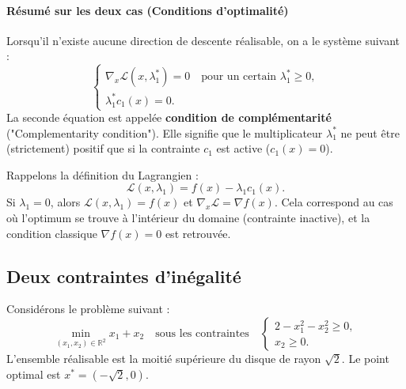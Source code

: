 \paragraph{Résumé sur les deux cas (Conditions d'optimalité)}
Lorsqu'il n'existe aucune direction de descente réalisable, on a le système suivant :
\begin{equation}
    \begin{cases}
        \nabla_x \mathcal{L}(x, \lambda_1^*) = 0 \quad \text{pour un certain } \lambda_1^* \ge 0, \\
        \lambda_1^* c_1(x) = 0.
    \end{cases}
\end{equation}
La seconde équation est appelée \textbf{condition de complémentarité} ("Complementarity condition").
Elle signifie que le multiplicateur $\lambda_1^*$ ne peut être (strictement) positif que si la contrainte $c_1$ est active ($c_1(x)=0$).

Rappelons la définition du Lagrangien :
\begin{equation}
    \mathcal{L}(x, \lambda_1) = f(x) - \lambda_1 c_1(x).
\end{equation}
Si $\lambda_1 = 0$, alors $\mathcal{L}(x, \lambda_1) = f(x)$ et $\nabla_x \mathcal{L} = \nabla f(x)$. Cela correspond au cas où l'optimum se trouve à l'intérieur du domaine (contrainte inactive), et la condition classique $\nabla f(x) = 0$ est retrouvée.

\subsection{Deux contraintes d'inégalité}

Considérons le problème suivant :
\begin{equation}
    \min_{(x_1, x_2) \in \mathbb{R}^2} x_1 + x_2 \quad \text{sous les contraintes} \quad 
    \begin{cases}
        2 - x_1^2 - x_2^2 \ge 0, \\
        x_2 \ge 0.
    \end{cases}
\end{equation}
L'ensemble réalisable est la moitié supérieure du disque de rayon $\sqrt{2}$.
Le point optimal est $x^* = (-\sqrt{2}, 0)$.

